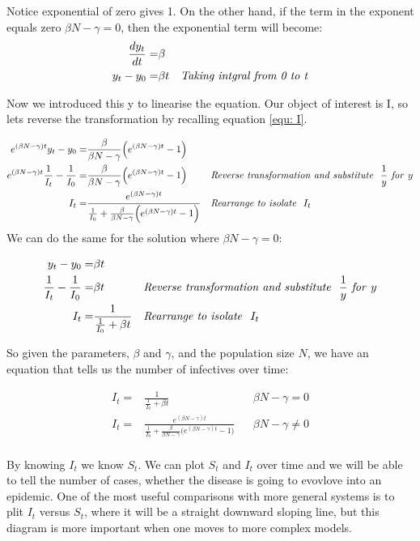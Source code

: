\documentclass[fontsize=17pt]{article}
\begin{document}
Notice exponential of zero gives 1. On the other hand, if the term in the exponent equals zero $\beta N -\gamma=0$, then the exponential term will become:
\begin{align}
	\frac{dy_{t}}{dt}=&\beta&&\\
	y_{t}-y_{0}=&\beta t&& \text{\textit{Taking intgral from 0 to t}}
\end{align}

Now we introduced this y to linearise the equation. Our object of interest is I, so lets reverse the transformation by recalling equation \ref{equ: I}.

 \begin{align}
e^{(\beta N- \gamma)t}y_{t}-y_{0}=&\frac{\beta}{\beta N-\gamma}\Big(e^{(\beta N- \gamma)t}-1\Big)&&\\
e^{(\beta N- \gamma)t}\frac{1}{I_{t}}-\frac{1}{I_{0}}=&\frac{\beta}{\beta N-\gamma}\Big(e^{(\beta N- \gamma)t}-1\Big)&& \text{\textit{Reverse transformation and substitute } }\frac{1}{y} \text{\textit{ for }} y\\
I_{t}=&\frac{e^{(\beta N- \gamma)t}}{\frac{1}{I_{0}}+\frac{\beta}{\beta N-\gamma}\Big(e^{(\beta N- \gamma)t}-1\Big)}&& \text{\textit{Rearrange to isolate } }I_{t}
\end{align}
We can do the same for the solution where $\beta N -\gamma=0$:

\begin{align}
y_{t}-y_{0}=&\beta t&&\\
\frac{1}{I_{t}}-\frac{1}{I_{0}}=&\beta t&& \text{\textit{Reverse transformation and substitute } }\frac{1}{y} \text{\textit{ for }} y\\
I_{t}=&\frac{1}{\frac{1}{I_{0}}+\beta t}&& \text{\textit{Rearrange to isolate } }I_{t}
\end{align}

So given the parameters, $\beta$ and $\gamma$, and the population size $N$, we have an equation that tells us the number of infectives over time:

\begin{align}
\label{equ: zero_condition}I_{t}=&\frac{1}{\frac{1}{I_{0}}+\beta t}&& \beta N -\gamma=0\\
\label{equ: nonzero_condition}I_{t}=&\frac{e^{(\beta N- \gamma)t}}{\frac{1}{I_{0}}+\frac{\beta}{\beta N-\gamma}\Big(e^{(\beta N- \gamma)t}-1\Big)}&&\beta N -\gamma \neq 0\\
\end{align}

By knowing $I_{t}$ we know $S_{t}$. We can plot $S_{t}$ and $I_{t}$ over time and we will be able to tell the number of cases, whether the disease is going to evovlove into an epidemic. One of the most useful comparisons with more general systems is to plit $I_{t}$ versus $S_{t}$, where it will be a straight downward sloping line, but this diagram is more important when one moves to more complex models.
\end{document}
